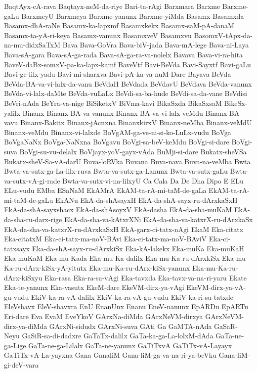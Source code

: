 {BaqtAyx-cA-rava
Baqtayx-neM-da-riye
Bari-ta-rAgi
Barxmara
Barxme
Barxme-gaLu
BarxmeyU
Barxmeya
Barxme-yanunx
Barxme-yiMda
Basamx
Basamxda
Basamx-dhA-raNe
Basamx-ka-lapxmf
Basamxkekx
Basamx-saM-pA-danaM
Basamx-ta-yA-ri-keya
Basamx-vanunx
BasamxveV
Basamxvu
BasomxV-tApx-da-na-mu-didxSaTxM
Bava
Bava-GoVra
Bava-biV-jada
Bava-mA-lege
Bava-ni-Laya
Bava-sA-gara
Bava-sA-ga-rada
Bava-sA-ga-ra-va-nolelx
Bavava
Bava-vi-ra-hita
BaveV-daBx-somxV-pa-ka-lapx-kamf
BaveVtf
Bavi-BeVda
Bavi-Sayxtf
Bavi-gaLu
Bavi-ge-lilx-yadu
Bavi-mi-sharxva
Bavi-pA-ka-va-nuM-Dare
Bayava
BeVda
BeVda-BA-va-vi-lalx-da-vanu
BeVdaH
BeVdada
BeVdavU
BeVdava
BeVda-vanunx
BeVda-vi-lalx-daMte
BeVda-vuLaLx
BeVdi-sa-ba-hude
BeVdi-sa-da-vane
BeVdisi
BeVri-nAda
BeYra-va-nige
BiSiketxV
BiVma-kavi
BikaSxda
BikaSxsaM
BikeSx-yalilx
Binanx
Binanx-BA-va-vanunx
Binanx-BA-va-vi-lalx-veMdu
Binanx-BA-vavu
Binanx-Bakitx
Binanx-jAcnxna
BinanxkirxV
Binanx-neMba
Binanx-veMdU
Binanx-veMdu
Binanx-vi-lalxde
BoVgAM-ga-ve-ni-si-ko-LuLx-vudu
BoVga
BoVgaNaNx
BoVga-NaNxna
BoVgavu
BoVgi-sa-beV-keMdu
BoVgi-si-dare
BoVgi-suva
BoVgi-su-vu-delalx
BoVjayx-yoV-gayx-vAda
BuMji-si-dare
Bukatx-sheVSa
Bukatx-sheV-Sa-vA-darU
Buva-loRVka
Buvana
Buva-nava
Buva-na-veMba
Bwta
Bwta-va-sutx-ga-La-lilx-ruva
Bwta-va-sutx-ga-Lanunx
Bwta-va-sutx-gaLu
Bwta-va-sutx-vA-gi-rade
Bwta-va-sutx-vi-na-lilxyU
Ca
Cala
Da
De
Dha
Dipo
E
ELu
ELu-vudu
EMba
ESaNaM
EkAMrA
EkAM-ta-rA-mi-taM-de-gaLa
EkAM-ta-rA-mi-taM-de-gaLu
EkANu
EkA-da-shAsayxH
EkA-da-shA-sayx-ru-dArxkaSxH
EkA-da-shA-sayxshacx
EkA-da-shAsoyxV
EkA-dasha
EkA-da-sha-muKaM
EkA-da-sha-ru-darx-rige
EkA-da-sha-va-kAtxrXNi
EkA-da-sha-va-katxrX-ru-dArxkaSx
EkA-da-sha-va-katxrX-ru-dArxkaSxH
EkA-garx-ci-tatx-nAgi
EkaM
Eka-citatx
Eka-citatxM
Eka-ci-tatx-ma-noV-BAvi
Eka-ci-tatx-ma-noV-BAviV
Eka-ci-tatxsayx
Eka-da-shA-sayx-ru-dArxkiSx
Eka-kA-lakekx
Eka-muKa
Eka-muKaH
Eka-muKaM
Eka-mu-Kada
Eka-mu-Ka-dalilx
Eka-mu-Ka-ru-dArxkiSx
Eka-mu-Ka-ru-dArx-kiSx-yA-yitutx
Eka-mu-Ka-ru-dArx-kiSx-yanunx
Eka-mu-Ka-ru-dArx-kiSxyu
Eka-rasa
Eka-ra-sa-vAgi
Eka-tavxda
Eka-tavx-va-na-ri-yaru
Ekate
Eka-te-yanunx
Eka-vasutx
EkeM-dare
EkeVM-dirx-ya-vAgi
EkeVM-dirx-ya-vA-gu-vudu
EkiV-ka-ra-vA-dalilx
EkiV-ka-ra-vA-gu-vudu
EkiV-ka-ri-su-tatxde
EleVshavx
EleV-shavxra
EnU
EnanUnx
Enanu
EneV-nanunx
EpARDu
EpARTu
Eri-dare
Eva
EvaM
EveYkoV
GArxNa-diMda
GArxNeVM-dirxya
GArxNeVM-dirx-ya-diMda
GArxNi-sidudx
GArxNi-suva
GAti
Ga
GaMTA-nAda
GaSaR-Neyu
GaSiR-sa-di-dadxre
GaTaTx-dalilx
GaTa-ka-ga-La-lolxM-dAda
GaTa-ne-ga-Lige
GaTa-ne-ga-Lilalx
GaTa-ne-yanunx
GaTiTxvA
GaTiTx-vA-Layayx
GaTiTx-vA-La-yayxna
Gana
GanaliM
Gana-liM-ga-va-na-ri-ya-beVku
Gana-liM-gi-deV-vara
}
